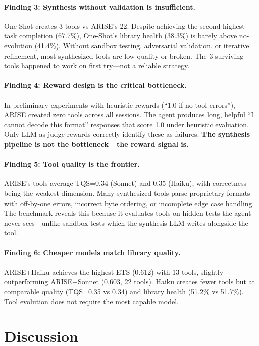 \documentclass[10pt,twocolumn]{article}
\begin{document}
\paragraph{Finding 3: Synthesis without validation is insufficient.} One-Shot creates 3 tools vs ARISE's 22. Despite achieving the second-highest task completion (67.7\%), One-Shot's library health (38.3\%) is barely above no-evolution (41.4\%). Without sandbox testing, adversarial validation, or iterative refinement, most synthesized tools are low-quality or broken. The 3 surviving tools happened to work on first try---not a reliable strategy.

\paragraph{Finding 4: Reward design is the critical bottleneck.} In preliminary experiments with heuristic rewards (``1.0 if no tool errors''), ARISE created zero tools across all sessions. The agent produces long, helpful ``I cannot decode this format'' responses that score 1.0 under heuristic evaluation. Only LLM-as-judge rewards correctly identify these as failures. \textbf{The synthesis pipeline is not the bottleneck---the reward signal is.}

\paragraph{Finding 5: Tool quality is the frontier.} ARISE's tools average TQS=0.34 (Sonnet) and 0.35 (Haiku), with correctness being the weakest dimension. Many synthesized tools parse proprietary formats with off-by-one errors, incorrect byte ordering, or incomplete edge case handling. The benchmark reveals this because it evaluates tools on hidden tests the agent never sees---unlike sandbox tests which the synthesis LLM writes alongside the tool.

\paragraph{Finding 6: Cheaper models match library quality.} ARISE+Haiku achieves the highest ETS (0.612) with 13 tools, slightly outperforming ARISE+Sonnet (0.603, 22 tools). Haiku creates fewer tools but at comparable quality (TQS=0.35 vs 0.34) and library health (51.2\% vs 51.7\%). Tool evolution does not require the most capable model.

\section{Discussion}
\end{document}
